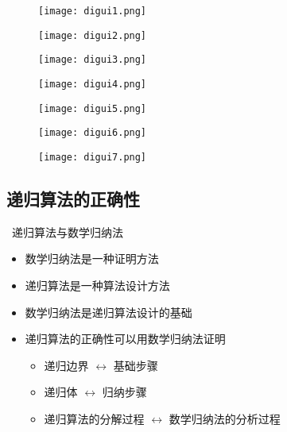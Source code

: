 \documentclass[UTF8]{report}
\theoremstyle{MyLineTheoremStyle} %
\theoremstyle{MyBlockTheoremStyle} %
\theoremstyle{MySubsubsectionStyle} %
\begin{document}
\begin{figure}[H]
    \centering
    \texttt{[image: digui1.png]}
\end{figure}

\begin{figure}[H]
    \centering
    \texttt{[image: digui2.png]}
\end{figure}

\begin{figure}[H]
    \centering
    \texttt{[image: digui3.png]}
\end{figure}

\begin{figure}[H]
    \centering
    \texttt{[image: digui4.png]}
\end{figure}

\begin{figure}[H]
    \centering
    \texttt{[image: digui5.png]}
\end{figure}

\begin{figure}[H]
    \centering
    \texttt{[image: digui6.png]}
\end{figure}

\begin{figure}[H]
    \centering
    \texttt{[image: digui7.png]}
\end{figure}

\subsection{递归算法的正确性}

\textbullet\ 递归算法与数学归纳法
\begin{itemize}
    \item 数学归纳法是一种证明方法
    \item 递归算法是一种算法设计方法
    \item 数学归纳法是递归算法设计的基础
    \item 递归算法的正确性可以用数学归纳法证明
    \begin{itemize}
        \item 递归边界 $\leftrightarrow$ 基础步骤
        \item 递归体 $\leftrightarrow$ 归纳步骤
        \item 递归算法的分解过程 $\leftrightarrow$ 数学归纳法的分析过程
    \end{itemize}
\end{itemize}
\end{document}
